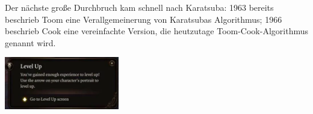 
\begin{minipage}[l]{9cm}
    \begin{remark}
        Der nächste große Durchbruch kam schnell nach Karatsuba: 1963 bereits beschrieb Toom\footnotemark{} eine Verallgemeinerung von Karatsubas Algorithmus; 1966 beschrieb Cook\footnotemark{} eine vereinfachte Version, die heutzutage Toom-Cook-Algorithmus genannt wird.
    \end{remark}
\end{minipage}\hfill
\begin{minipage}{5cm}
    \setlength{\baselineskip}{7pt}
    \includegraphics[width=5cm]{levelup_bg}
\end{minipage}


